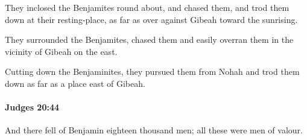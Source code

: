 			\begin{versebox}
					\item[BHS] 
					\item[ASV] They inclosed the Benjamites round about, and chased them, and trod them down at their resting-place, as far as over against Gibeah toward the sunrising.
					\item[NIV] They surrounded the Benjamites, chased them and easily overran them in the vicinity of Gibeah on the east.
					\item[NRSV] Cutting down the Benjaminites, they pursued them from Nohah and trod them down as far as a place east of Gibeah.
			\end{versebox}

		\paragraph{Judges 20:44} %
			\label{JUDGES-20-44}

			And there fell of Benjamin eighteen thousand men; all these were men of valour.

